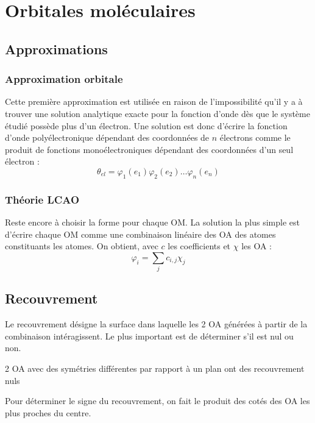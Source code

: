 \documentclass[french]{yLectureNote}
\begin{document}
\section{Orbitales moléculaires}
\subsection{Approximations}
\subsubsection{Approximation orbitale}
Cette première approximation est utilisée en raison de l'impossibilité qu'il y a à trouver une solution analytique exacte pour la fonction d'onde dès que le système étudié possède plus d'un électron. Une solution est donc d'écrire la fonction d'onde polyélectronique dépendant des coordonnées de $n$ électrons comme le produit de fonctions monoélectroniques dépendant  des coordonnées d'un seul électron :
\begin{equation}
 \theta_{el} = \varphi_1(e_1)\varphi_2(e_2)\dots\varphi_n(e_n)
\end{equation}
\subsubsection{Théorie LCAO}
Reste encore à choisir la forme pour chaque OM. La solution la plus simple est d'écrire chaque OM comme une combinaison linéaire des OA des atomes constituants les atomes. On obtient, avec $c$ les coefficients et $\chi$ les OA :
\begin{equation}
\varphi_i = \sum_j c_{i,j}\chi_j
\end{equation}
\subsection{Recouvrement}
Le recouvrement désigne la surface dans laquelle les 2 OA générées à partir de la combinaison intéragissent. Le plus important est de déterminer s'il est nul ou non.
\begin{theorem}[Recouvrement]
2 OA avec des symétries différentes par rapport à un plan  ont des recouvrement nuls
\end{theorem}
Pour déterminer le signe du recouvrement, on fait le produit des cotés des OA les plus proches du centre.
\end{document}
